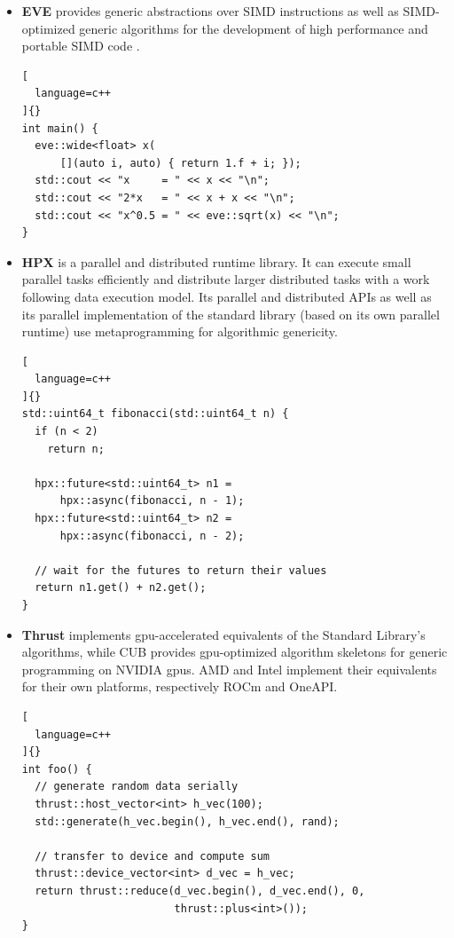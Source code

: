 \documentclass[../main]{subfiles}
\begin{document}
\begin{itemize}
\begin{lstlisting}[
  language=c++
]{}
int main() {
  table<double> x;
  table<double> y = ones(4, 4);

  x = 40.0 * y + 2.0;

  NT2_DISPLAY(x);
}
\end{lstlisting}

  \item

\textbf{EVE} \cite{eve} provides generic abstractions over SIMD instructions
as well as SIMD-optimized generic algorithms for the development of
high performance and portable SIMD code \cite{hpcs2018-matvec}.

\begin{lstlisting}[
  language=c++
]{}
int main() {
  eve::wide<float> x(
      [](auto i, auto) { return 1.f + i; });
  std::cout << "x     = " << x << "\n";
  std::cout << "2*x   = " << x + x << "\n";
  std::cout << "x^0.5 = " << eve::sqrt(x) << "\n";
}
\end{lstlisting}

  \item

\textbf{HPX} \cite{hpx} is a \cpp parallel and distributed runtime library.
It can execute small parallel tasks efficiently and distribute
larger distributed tasks with a work following data execution model.
Its parallel and distributed APIs as well as its parallel implementation of
the standard library (based on its own parallel runtime) use metaprogramming
for algorithmic genericity.

\begin{lstlisting}[
  language=c++
]{}
std::uint64_t fibonacci(std::uint64_t n) {
  if (n < 2)
    return n;

  hpx::future<std::uint64_t> n1 =
      hpx::async(fibonacci, n - 1);
  hpx::future<std::uint64_t> n2 =
      hpx::async(fibonacci, n - 2);

  // wait for the futures to return their values
  return n1.get() + n2.get();
}
\end{lstlisting}

  \item

\textbf{Thrust} \cite{thrust} implements \gls{gpu}-accelerated equivalents
of the Standard Library's algorithms, while CUB \cite{cub} provides
\gls{gpu}-optimized algorithm skeletons for generic programming on NVIDIA
\glspl{gpu}.
AMD and Intel implement their equivalents for their own platforms, respectively
ROCm and OneAPI.

\begin{lstlisting}[
  language=c++
]{}
int foo() {
  // generate random data serially
  thrust::host_vector<int> h_vec(100);
  std::generate(h_vec.begin(), h_vec.end(), rand);

  // transfer to device and compute sum
  thrust::device_vector<int> d_vec = h_vec;
  return thrust::reduce(d_vec.begin(), d_vec.end(), 0,
                        thrust::plus<int>());
}
\end{lstlisting}

\end{itemize}
\end{document}
